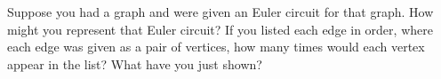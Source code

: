 \documentclass{book}
\begin{document}
\setcounter{cpjt}{17}
\addtocounter{cpjt}{-1}
\begin{activity}\label{activity-12}
\hypertarget{p-187}{}%
Suppose you had a graph and were given an Euler circuit for that graph.  How might you represent that Euler circuit?  If you listed each edge in order, where each edge was given as a pair of vertices, how many times would each vertex appear in the list?  What have you just shown?%
\end{activity}

\clearpage
\end{document}
